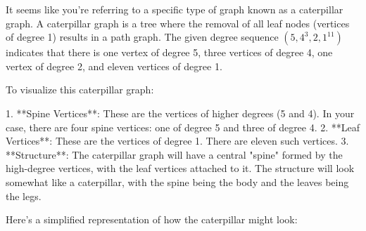 It seems like you're referring to a specific type of graph known as a caterpillar graph. A caterpillar graph is a tree where the removal of all leaf nodes (vertices of degree 1) results in a path graph. The given degree sequence \((5, 4^3, 2, 1^{11})\) indicates that there is one vertex of degree 5, three vertices of degree 4, one vertex of degree 2, and eleven vertices of degree 1.

To visualize this caterpillar graph:

1. **Spine Vertices**: These are the vertices of higher degrees (5 and 4). In your case, there are four spine vertices: one of degree 5 and three of degree 4.
2. **Leaf Vertices**: These are the vertices of degree 1. There are eleven such vertices.
3. **Structure**: The caterpillar graph will have a central "spine" formed by the high-degree vertices, with the leaf vertices attached to it. The structure will look somewhat like a caterpillar, with the spine being the body and the leaves being the legs.

Here's a simplified representation of how the caterpillar might look:

